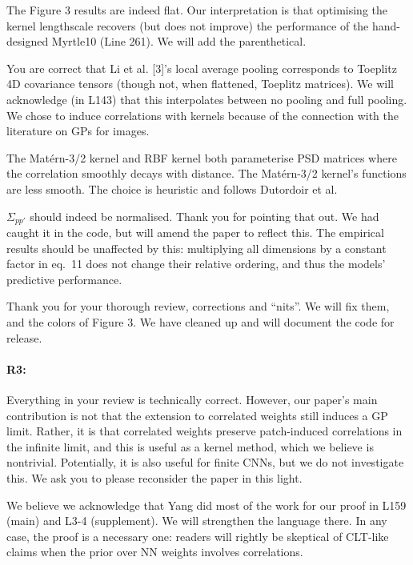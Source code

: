 \documentclass{article}
\newcommand{\adriacomment}[1]{\todo[color=blue]{#1}}
\begin{document}
The Figure 3 results are indeed flat. Our interpretation is that optimising the kernel lengthscale recovers (but does not improve) the performance of the hand-designed Myrtle10 (Line 261). We will add the parenthetical. %

You are correct that Li et al. [3]'s local average pooling corresponds to Toeplitz 4D covariance tensors (though not, when flattened, Toeplitz matrices). We will acknowledge (in L143) that this interpolates between no pooling and full pooling. We chose to induce correlations with kernels because of the connection with the literature on GPs for images.

The Matérn-3/2 kernel and RBF kernel both parameterise PSD matrices where the correlation smoothly decays with distance. The Matérn-3/2 kernel's functions are less smooth. The choice is heuristic and follows Dutordoir et al.

$\Sigma_{{pp'}}$ should indeed be normalised. Thank you for pointing that out. We had caught it in the code, but will amend the paper to reflect this. The empirical results should be unaffected by this: multiplying all dimensions by a constant factor in eq.~11 does not change their relative ordering, and thus the models' predictive performance.

Thank you for your thorough review, corrections and ``nits''. We will fix them, and the colors of Figure 3. We have cleaned up and will document the code for release.
\vspace{-1.5ex}
\paragraph{R3:}
Everything in your review is technically correct. However, our paper's main contribution is not that the extension to correlated weights still induces a GP limit. Rather, it is that correlated weights preserve patch-induced correlations in the infinite limit, and this is useful as a kernel method, which we believe is nontrivial. Potentially, it is also useful for finite CNNs, but we do not investigate this. We ask you to please reconsider the paper in this light.

We believe we acknowledge that Yang did most of the work for our proof in L159 (main) and L3-4 (supplement). We will strengthen
the language there. In any case, the proof is a necessary one: readers will rightly be
skeptical of CLT-like claims when the prior over NN weights involves correlations.
\end{document}
